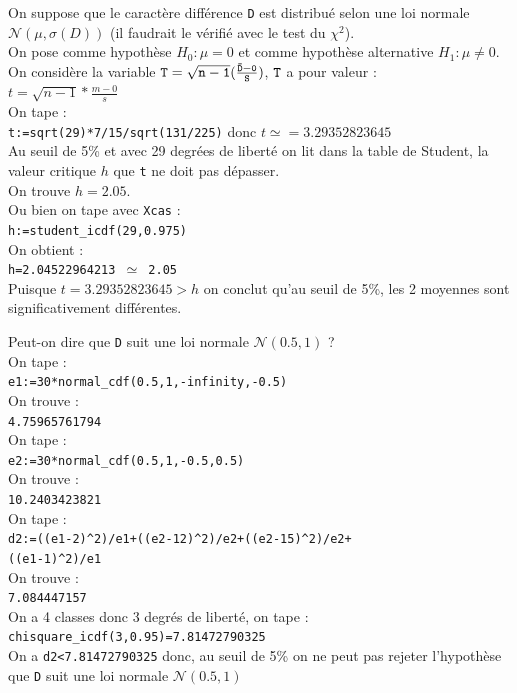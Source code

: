\documentclass[a4paper,11pt]{book}
\begin{document}
\begin{itemize}
On suppose que le caract\`ere diff\'erence {\tt D} est distribu\'e
 selon une loi normale $\mathcal N(\mu,\sigma(D))$ (il faudrait le 
v\'erifi\'e avec le test du $\chi^2$).\\
On pose comme hypoth\`ese $H_0 :\mu=0$ et comme hypoth\`ese alternative 
$H_1: \mu \neq 0$.\\
On consid\`ere la variable ${\tt T=\sqrt{n-1}(\frac{\bar D-0}{S})}$, ${\tt T}$ 
a pour valeur  :\\
$t=\sqrt{n-1}*\frac{m-0}{s}$\\
On tape :\\
{\tt t:=sqrt(29)*7/15/sqrt(131/225)}
donc $t\simeq=3.29352823645$\\
Au seuil de 5\% et avec 29 degr\'ees de libert\'e on lit dans la table de
 Student, la valeur critique $h$ que {\tt t} ne doit pas d\'epasser. \\
On trouve $h= 2.05$.\\
Ou bien on tape avec {\tt Xcas} :\\
{\tt h:=student\_icdf(29,0.975)}\\
On obtient :\\
{\tt h=2.04522964213 $\simeq$ 2.05}\\
Puisque $t=3.29352823645>h$ on conclut qu'au seuil de 5\%, les 2 moyennes sont 
 significativement diff\'erentes.

Peut-on dire que {\tt D} suit une loi normale $\mathcal N(0.5,1)$ ?\\
On tape :\\
{\tt e1:=30*normal\_cdf(0.5,1,-infinity,-0.5)}\\
On trouve :\\
{\tt 4.75965761794}\\
On tape :\\
{\tt e2:=30*normal\_cdf(0.5,1,-0.5,0.5)}\\
On trouve :\\
{\tt 10.2403423821}\\
On tape :\\
{\tt d2:=((e1-2)\verb|^|2)/e1+((e2-12)\verb|^|2)/e2+((e2-15)\verb|^|2)/e2+\\
((e1-1)\verb|^|2)/e1}\\
On trouve :\\
{\tt 7.084447157}\\
On a 4 classes donc 3 degr\'es de libert\'e, on tape :\\
{\tt chisquare\_icdf(3,0.95)=7.81472790325}\\
On a {\tt d2<7.81472790325} donc,
au seuil de 5\% on ne peut pas rejeter l'hypoth\`ese que {\tt D} suit 
une loi normale $\mathcal N(0.5,1)$
\end{itemize}
\end{document}
